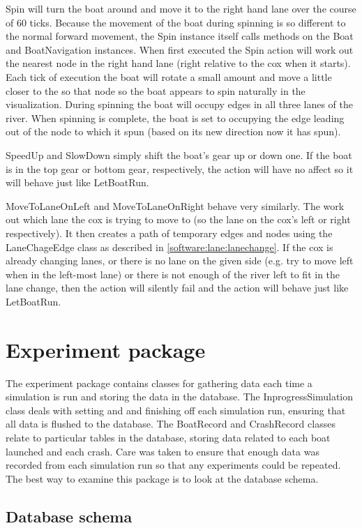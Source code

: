   Spin will turn the boat around and move it to the right hand lane over the course of 60 ticks. Because the movement of the boat during spinning is so different to the normal forward movement, the Spin instance itself calls methods on the Boat and BoatNavigation instances. When first executed the Spin action will work out the nearest node in the right hand lane (right relative to the cox when it starts). Each tick of execution the boat will rotate a small amount and move a little closer to the so that node so the boat appears to spin naturally in the visualization. During spinning the boat will occupy edges in all three lanes of the river. When spinning is complete, the boat is set to occupying the edge leading out of the node to which it spun (based on its new direction now it has spun).
  
  SpeedUp and SlowDown simply shift the boat's gear up or down one. If the boat is in the top gear or bottom gear, respectively, the action will have no affect so it will behave just like LetBoatRun.
  
  MoveToLaneOnLeft and MoveToLaneOnRight behave very similarly. The work out which lane the cox is trying to move to (so the lane on the cox's left or right respectively). It then creates a path of temporary edges and nodes using the LaneChageEdge class as described in \ref{software:lane:lanechange}. If the cox is already changing lanes, or there is no lane on the given side (e.g. try to move left when in the left-most lane) or there is not enough of the river left to fit in the lane change, then the action will silently fail and the action will behave just like LetBoatRun.

\section{Experiment package}\label{software:experiment}
The experiment package contains classes for gathering data each time a
simulation is run and storing the data in the database. The
InprogressSimulation class deals with setting and and finishing off
each simulation run, ensuring that all data is flushed to the
database. The BoatRecord and CrashRecord classes relate to particular
tables in the database, storing data related to each boat launched and
each crash. Care was taken to ensure that enough data was recorded
from each simulation run so that any experiments could be repeated.
The best way to examine this package is to look at the database schema.

\subsection{Database schema}\label{software:experiment:db}

